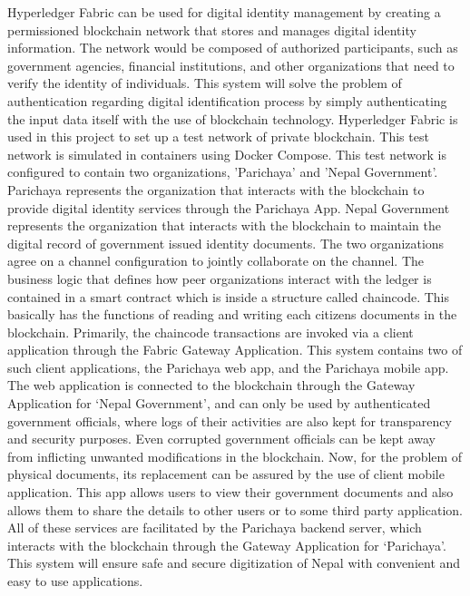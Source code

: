 Hyperledger Fabric can be used for digital identity management by creating a permissioned blockchain network that stores and manages digital identity information. The network would be composed of authorized participants, such as government agencies, financial institutions, and other organizations that need to verify the identity of individuals. This system will solve the problem of authentication regarding digital identification process by simply authenticating the input data itself with the use of blockchain technology. Hyperledger Fabric is used in this project to set up a test network of private blockchain. This test network is simulated in containers using Docker Compose. This test network is configured to contain two organizations, ’Parichaya’ and ’Nepal Government’. Parichaya represents the organization that interacts with the blockchain to provide digital identity services through the Parichaya App. Nepal Government represents the organization that interacts with the blockchain to maintain the digital record of government issued identity documents. The two organizations agree on a channel configuration to jointly collaborate on the channel. The business logic that defines how peer organizations interact with the ledger is contained in a smart contract which is inside a structure called chaincode. This basically has the functions of reading and writing each citizens documents in the blockchain. Primarily, the chaincode transactions are invoked via a client application through the Fabric Gateway Application. This system contains two of such client applications, the Parichaya web app, and the Parichaya mobile app. The web application is connected to the blockchain through the Gateway Application for ‘Nepal Government’, and  can only be used by authenticated government officials, where logs of their activities are also kept for transparency and security purposes. Even corrupted government officials can be kept away from inflicting unwanted modifications in the blockchain. Now, for the problem of physical documents, its replacement can be assured by the use of client mobile application. This app allows users to view their government documents and also allows them to share the details to other users or to some third party application. All of these services are facilitated by the Parichaya backend server, which interacts with the blockchain through the Gateway Application for ‘Parichaya’. This system will ensure safe and secure digitization of Nepal with convenient and easy to use applications.

